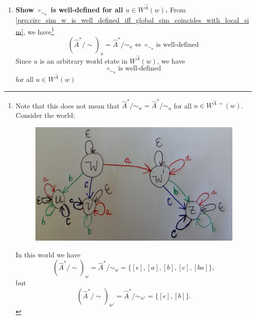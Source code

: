 \begin{proofE}
\begin{enumerate}
    \item \textbf{Show $\circ_{\sim_{u}}$ is well-defined for all $u \in W^{\hat{A}}(w)$.}
    From \cref{prp:circ_sim_w_is_well_defined_iff_global_sim_coincides_with_local_sim}, we have\footnote{
    Note that this does not mean that $\hat{A}^{*}/\sim_{w} = \hat{A}^{*}/\sim_{u}$ for all $u \in W^{\hat{A}\to}(w)$.
    Consider the world:
    \begin{figure}[H]
        \includegraphics[width=0.5\linewidth]{6BeyondSBDRLLocalAlgebras/Images/circ_sim_w_defined_does_not_mean_algebra_is_constant.jpeg}
        \caption{}
    \end{figure}
    In this world we have
    \begin{equation}
        (\hat{A}^{*}/\sim)_{w} = \hat{A}^{*}/\sim_{w} = \{ [\epsilon], [a], [b], [c], [ba] \},
    \end{equation}
    but
    \begin{equation}
        (\hat{A}^{*}/\sim)_{w'} = \hat{A}^{*}/\sim_{w'} = \{ [\epsilon], [b] \}.
    \end{equation}
    }
    \begin{equation}
        (\hat{A}^{*}/\sim)_{u} = \hat{A}^{*}/\sim_{u} \iff \text{$\circ_{\sim_{u}}$ is well-defined}
    \end{equation}
    Since $u$ is an arbitrary world state in $W^{\hat{A}}(w)$, we have
    \begin{equation}
        \text{$\circ_{\sim_{u}}$ is well-defined}
    \end{equation}
    for all $u \in W^{\hat{A}}(w)$
\end{enumerate}
\end{proofE}


